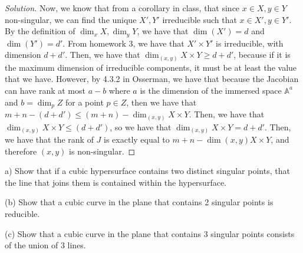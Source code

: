 \documentclass[10pt]{article}
\newenvironment{problem}[2][Problem]{\begin{trivlist}
\item[\hskip \labelsep {\bfseries #1}\hskip \labelsep {\bfseries #2.}]}{\end{trivlist}}
\begin{document}
\begin{proof}[Solution]
Now, we know that from a corollary in class, that since $x\in X, y \in Y$ non-singular, we can find the unique $X', Y'$ irreducible such that $x \in X', y \in Y'$. By the definition of $\dim_x X, \dim_y Y$, we have that $\dim(X') = d$ and $\dim(Y') = d'$. From homework 3, we have that $X' \times Y'$ is irreducible, with dimension $d + d'$. Then, we have that $\dim_{(x,y)} X \times Y   \geq  d + d'$, because if it is the maximum dimension of irreducible components, it must be at least the value that we have. However, by 4.3.2 in Osserman, we have that because the Jacobian can have rank at most $a - b$ where $a$ is the dimension of the immersed space $\mathbb{A}^a$ and $b = \dim_{p} Z$ for a point $p \in Z$, then we have that $m + n - (d + d') \leq (m + n) - \dim_{(x,y)} X \times Y$. Then, we have that $\dim_{(x,y)} X \times Y \leq (d + d')$, so we have that $\dim_{(x,y)} X \times Y = d + d'$. Then, we have that the rank of $J$ is exactly equal to $m + n - \dim{(x,y)} X \times Y$, and therefore $(x,y)$ is non-singular.

\end{proof}

\begin{problem}{7.3}

(a) Show that if a cubic hypersurface contains two distinct singular points, that the line that joins them is contained within the hypersurface.

(b) Show that a cubic curve in the plane that contains 2 singular points is reducible.

(c) Show that a cubic curve in the plane that contains 3 singular points consists of the union of 3 lines.

\end{problem}
\end{document}
